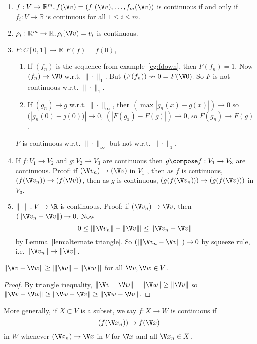 \documentclass[a4paper]{article}
\theoremstyle{definition}
\begin{document}
\begin{eg}\leavevmode
  \begin{enumerate}
  \item $f:V\to \mathbb{R}^m, f(\V v) = (f_1(\V v), \ldots, f_m(\V v))$ is continuous if and only if $f_i:V\to \mathbb{R}$ is continuous for all $1\leq i \leq m$.
  \item $\rho_i:\mathbb{R}^m\to \mathbb{R}, \rho_i(\V v) =v_i$ is continuous.
  \item $F:C[0,1]\to\mathbb{R}, F(f)=f(0)$,
    \begin{enumerate}
    \item If $(f_n)$ is the sequence from example~\ref{eg:fdown}, then $F(f_n)=1$. Now $(f_n)\to \V 0$ w.r.t. $\|\cdot\|_1$. But $(F(f_n))\nrightarrow 0=F(\V 0)$. So $F$ is not continuous w.r.t. $\|\cdot\|_1$.
      \item If $(g_n)\to g$ w.r.t. $\|\cdot\|_\infty$, then $(\max|g_n(x)-g(x)|)\to 0$ so $(|g_n(0)-g(0))|\to 0$, $(|F(g_n)-F(g)|)\to 0$, so $F(g_n)\to F(g)$.
    \end{enumerate}
    $F$ is continuous w.r.t. $\|\cdot\|_\infty$ but not w.r.t. $\|\cdot\|_1$.
  \item If $f:V_1\to V_2$ and $g:V_2\to V_3$ are continuous then $g\compose f: V_1\to V_3$ are continuous. Proof: if $(\V v_n) \to (\V v)$ in $V_1$ , then as $f$ is continuous, $(f(\V v_n)) \to (f(\V v))$, then as $g$ is continuous, $(g(f(\V v_n))) \to (g(f(\V v)))$ in $V_3$.
  \item $\|\cdot\|: V \to \R$ is continuous. Proof: if $(\V v_n)\to \V v$, then $(\|\V v_n - \V v\|) \to 0$. Now
    \[
      0 \leq |\|\V v_n\| - \|\V v\|| \leq \|\V v_n - \V v\|
    \]
    by Lemma~\ref{lem:alternate triangle}. So $(|\|\V v_n - \V v\||) \to 0$ by squeeze rule, i.e. $\|\V v_n\| \to \|\V v\|$.
  \end{enumerate}
\end{eg}

\begin{lem}
  \label{lem:alternate triangle}
  $\|\V v- \V w\| \geq |\|\V v\| - \|\V w\||$ for all $\V v, \V w \in V$.
\end{lem}

\begin{proof}
  By triangle inequality, $\|\V v- \V w\| - \|\V w\| \geq \|\V v \|$ so $\|\V v - \V w\| \geq \|\V w - \V v\| \geq \|\V w - \V v\|$.
\end{proof}

More generally, if $X\subset V$ is a subset, we say $f:X\to W$ is continuous if
\[
  (f(\V x_n)) \to f(\V x)
\]
in $W$ whenever $(\V x_n) \to \V x$ in $V$ for $\V x$ and all $\V x_n \in X$.
\end{document}

